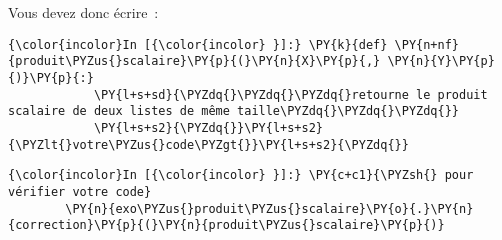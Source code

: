     Vous devez donc écrire~:

    \begin{Verbatim}[commandchars=\\\{\}]
{\color{incolor}In [{\color{incolor} }]:} \PY{k}{def} \PY{n+nf}{produit\PYZus{}scalaire}\PY{p}{(}\PY{n}{X}\PY{p}{,} \PY{n}{Y}\PY{p}{)}\PY{p}{:} 
            \PY{l+s+sd}{\PYZdq{}\PYZdq{}\PYZdq{}retourne le produit scalaire de deux listes de même taille\PYZdq{}\PYZdq{}\PYZdq{}}
            \PY{l+s+s2}{\PYZdq{}}\PY{l+s+s2}{\PYZlt{}votre\PYZus{}code\PYZgt{}}\PY{l+s+s2}{\PYZdq{}}
\end{Verbatim}


    \begin{Verbatim}[commandchars=\\\{\}]
{\color{incolor}In [{\color{incolor} }]:} \PY{c+c1}{\PYZsh{} pour vérifier votre code}
        \PY{n}{exo\PYZus{}produit\PYZus{}scalaire}\PY{o}{.}\PY{n}{correction}\PY{p}{(}\PY{n}{produit\PYZus{}scalaire}\PY{p}{)}
\end{Verbatim}